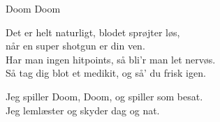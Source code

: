 \begin{song}{Doom Doom}
  \begin{SBSection*}
    Det er helt naturligt, blodet sprøjter løs,\\
    når en super shotgun er din ven.\\
    Har man ingen hitpoints, så bli'r man let nervøs.\\
    Så tag dig blot et medikit, og så' du frisk igen.
  \end{SBSection*}

  \begin{SBChorus}
  \end{SBChorus}

  \begin{SBChorus}
    Jeg spiller Doom, Doom, og spiller som besat.\\
    Jeg lemlæster og skyder dag og nat.
  \end{SBChorus}
\end{song}